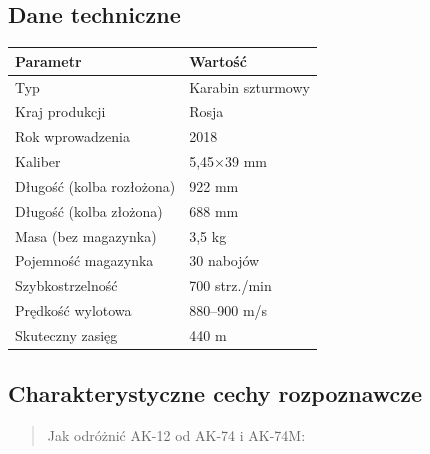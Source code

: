 \documentclass[12pt,oneside]{book}
\begin{document}
\subsection{Dane techniczne}\label{dane-techniczne-62}

\begin{longtable}[]{@{}ll@{}}
\toprule\noalign{}
Parametr & Wartość \\
\midrule\noalign{}
\endhead
\bottomrule\noalign{}
\endlastfoot
Typ & Karabin szturmowy \\
Kraj produkcji & Rosja \\
Rok wprowadzenia & 2018 \\
Kaliber & 5,45×39 mm \\
Długość (kolba rozłożona) & 922 mm \\
Długość (kolba złożona) & 688 mm \\
Masa (bez magazynka) & 3,5 kg \\
Pojemność magazynka & 30 nabojów \\
Szybkostrzelność & 700 strz./min \\
Prędkość wylotowa & 880--900 m/s \\
Skuteczny zasięg & 440 m \\
\end{longtable}

\subsection{Charakterystyczne cechy
rozpoznawcze}\label{charakterystyczne-cechy-rozpoznawcze-62}

\begin{quote}
Jak odróżnić AK-12 od AK-74 i AK-74M:
\end{quote}
\end{document}
